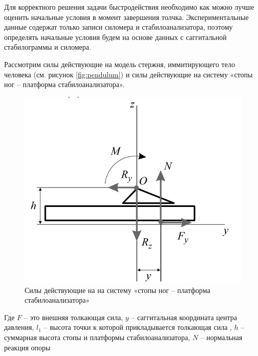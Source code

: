 \documentclass[a4paper,12pt, openany]{book}
\theoremstyle{plain} %
\theoremstyle{definition} %
\theoremstyle{remark} %
\numberwithin{equation}{chapter}
\begin{document}
{Для корректного решения задачи быстродействия необходимо как можно лучше оценить
начальные условия в момент завершения толчка. Экспериментальные данные содержат только записи силомера
и стабилоанализатора, поэтому определять начальные условия будем на основе данных с саггитальной стабилограммы и силомера.

Рассмотрим силы действующие на модель стержня, иммитирующего тело человека (см. рисунок \ref{fig:pendulum})
и силы действующие на систему «стопы ног – платформа стабилоанализатора».
\begin{figure}[h!]
    \centering
    \includegraphics[width=0.5\linewidth]{foot.png}
    \caption{Силы действующие на на систему «стопы ног – платформа стабилоанализатора» }
    \label{fig:foot-platform}
\end{figure}

Где $F$ – это внешняя толкающая сила, $y$ – саггитальная координата центра давления, $l_1$ – высота точки к которой прикладывается толкающая сила
, $h$ – суммарная высота стопы и платформы стабилоанализатора, $N$ – нормальная реакция опоры

}
\end{document}
